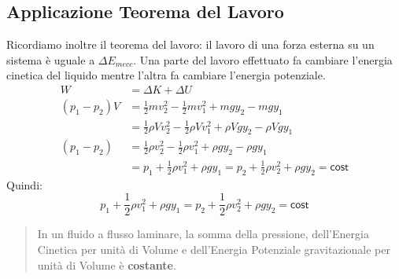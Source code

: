         \subsection{Applicazione Teorema del Lavoro}
        Ricordiamo inoltre il teorema del lavoro: il lavoro di una forza 
        esterna su un sistema è uguale a $\Delta E_{mecc}$. Una parte del 
        lavoro effettuato fa cambiare l'energia cinetica del liquido mentre 
        l'altra fa cambiare l'energia potenziale.
            \begin{align*}
                W &= \Delta K + \Delta U \\
                (p_1 - p_2)V &= \frac{1}{2}mv^2_2 - \frac{1}{2}mv^2_1 
                                + mgy_2 - mgy_1 \\
                &= \frac{1}{2}\rho Vv^2_2 - \frac{1}{2}\rho Vv^2_1 
                                + \rho V g y_2 - \rho V g y_1 \\
                (p_1 - p_2) &= \frac{1}{2}\rho v^2_2 
                                - \frac{1}{2}\rho v^2_1 
                                + \rho g y_2 - \rho g y_1 \\
                &= p_1 + \frac{1}{2}\rho v^2_1 + \rho g y_1 =
                    p_2 + \frac{1}{2}\rho v^2_2 + \rho g y_2 = \textsf{cost}
            \end{align*}
        Quindi:
            \begin{equation}
                p_1 + \frac{1}{2}\rho v^2_1 + \rho g y_1 
                =
                p_2 + \frac{1}{2}\rho v^2_2 + \rho g y_2 
                = 
                \textsf{cost}
            \end{equation}
            \begin{quote}
                In un fluido a flusso laminare, la somma della pressione, 
                dell'Energia Cinetica per unità di Volume e dell'Energia 
                Potenziale gravitazionale per unità di Volume è 
                \textbf{costante}.
            \end{quote}
